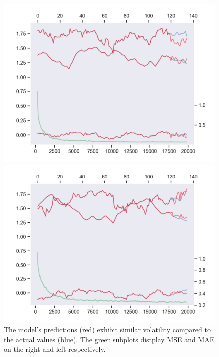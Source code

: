 \documentclass{article}
\begin{document}
\begin{figure}[!tpb]
  \centering
  \begin{minipage}[b]{0.49\textwidth}
    \includegraphics[width=\textwidth]{paper/imgs/vmaxse.png}
  \end{minipage}
  \hfill
  \begin{minipage}[b]{0.49\textwidth}
    \includegraphics[width=\textwidth]{paper/imgs/vmaxae.png}
  \end{minipage}
  \caption{The model's predictions (red) exhibit similar volatility compared to the actual values (blue). The green subplots distplay MSE and MAE on the right and left respectively.}
  \label{fig:VMaxSE & VMaxAE}
\end{figure}
\end{document}
